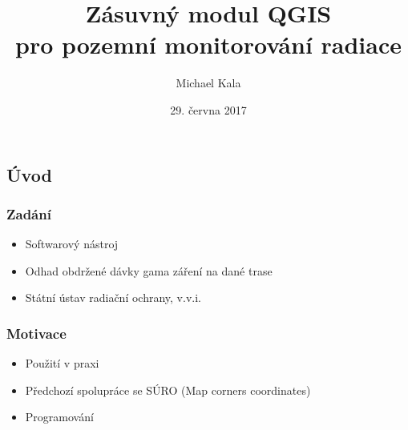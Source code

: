 \documentclass{beamer}
\title{Zásuvný modul QGIS \\pro pozemní monitorování radiace}
\author{Michael Kala}
\date{29. června 2017}
\begin{document}
\begin{frame}
\titlepage
\end{frame}

\begin{frame}
\section{Úvod}
\frametitle{Zadání}

\begin{itemize}

	 
	\item Softwarový nástroj
	\item Odhad obdržené dávky gama záření na dané trase
	\item Státní ústav radiační ochrany, v.v.i.
	 
	

\end{itemize}
\end{frame}

\begin{frame}
\frametitle{Motivace}
\begin{itemize}
	\item Použití v praxi
	\item Předchozí spolupráce se SÚRO (Map corners coordinates)
	\item Programování
\end{itemize}
\end{frame}
\end{document}
